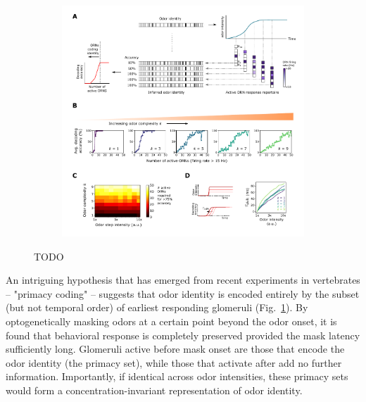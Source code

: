 \begin{figure}[!tb]
	\begin{subfigure}[t]{\linewidth}
		\includegraphics[width=\textwidth]{figures/5_primacy_coding}
		\label{fig:primacy_coding_a}	
	\end{subfigure}
	\begin{subfigure}[t]{0\linewidth}
		\label{fig:primacy_coding_b}
	\end{subfigure}
	\begin{subfigure}[t]{0\linewidth}
		\label{fig:primacy_coding_c}
	\end{subfigure}
	\begin{subfigure}[t]{0\linewidth}
		\label{fig:primacy_coding_d}
	\end{subfigure}
	\caption{\footnotesize{TODO}}
	\label{fig:primacy_coding}
\end{figure}



An intriguing hypothesis that has emerged from recent experiments in vertebrates -- "primacy coding" -- suggests  that odor identity is encoded entirely by the subset (but not temporal order) of earliest responding glomeruli (Fig.~\ref{fig:primacy_coding_a}). By optogenetically masking odors at a certain point beyond the odor onset, it is found that behavioral response is completely preserved provided the mask latency  sufficiently long. Glomeruli active before mask onset are those that encode the odor identity (the primacy set), while those that activate after add no further information. Importantly,  if   identical across odor intensities, these primacy sets  would form a concentration-invariant representation of odor identity. 

